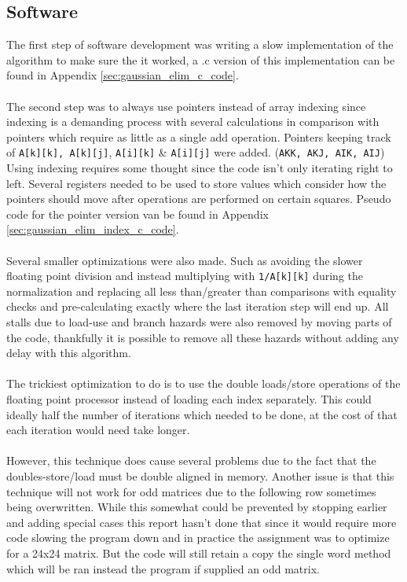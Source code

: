 \documentclass{article}
\begin{document}
\subsection{Software}
The first step of software development was writing a slow implementation of the algorithm to make sure the it worked, a .c version of this implementation can be found in Appendix \ref{sec:gaussian_elim_c_code}.
\\\\
The second step was to always use pointers instead of array indexing since indexing is a demanding 
process with several calculations in comparison with pointers which require as little as a single add operation. Pointers keeping track of \verb!A[k][k], !\verb!A[k][j]!, \verb!A[i][k]! \& \verb!A[i][j]! were added. (\verb!AKK, AKJ, AIK, AIJ!)
Using indexing requires some thought since the code isn't only iterating right to left. Several registers needed to be used to store values which consider how the pointers should move after operations are performed on certain squares. Pseudo code for the pointer version van be found in Appendix \ref{sec:gaussian_elim_index_c_code}. 
\\\\
Several smaller optimizations were also made. Such as avoiding the slower floating point division and instead multiplying with \verb!1/A[k][k]! during the normalization and replacing all less than/greater than comparisons with equality checks and pre-calculating exactly where the last iteration step will end up. All stalls due to load-use and branch hazards were also removed by moving parts of the code, thankfully it is possible to remove all these hazards without adding any delay with this algorithm. 
\\\\
The trickiest optimization to do is to use the double loads/store operations of the floating point processor instead of loading each index separately. This could ideally half the number of iterations which needed to be done, at the cost of that each iteration would need take longer.
\\\\
However, this technique does cause several problems due to the fact that the doubles-store/load must be double aligned in memory. Another issue is that this technique will not work for odd matrices due to the following row sometimes being overwritten. While this somewhat could be prevented by stopping earlier and adding special cases this report hasn't done that since it would require more code slowing the program down and in practice the assignment was to optimize for a 24x24 matrix. But the code will still retain a copy the single word method which will be ran instead the program if supplied an odd matrix.
\end{document}
